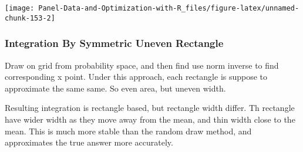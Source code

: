 \documentclass[
]{book}
\begin{document}
\begin{center}\texttt{[image: Panel-Data-and-Optimization-with-R\_files/figure-latex/unnamed-chunk-153-2]} \end{center}

\hypertarget{integration-by-symmetric-uneven-rectangle}{%
\subsubsection{Integration By Symmetric Uneven Rectangle}\label{integration-by-symmetric-uneven-rectangle}}

Draw on grid from probability space, and then find use norm inverse to find corresponding x point. Under this approach, each rectangle is suppose to approximate the same same. So even area, but uneven width.

Resulting integration is rectangle based, but rectangle width differ. Th rectangle have wider width as they move away from the mean, and thin width close to the mean. This is much more stable than the random draw method, and approximates the true answer more accurately.
\end{document}
